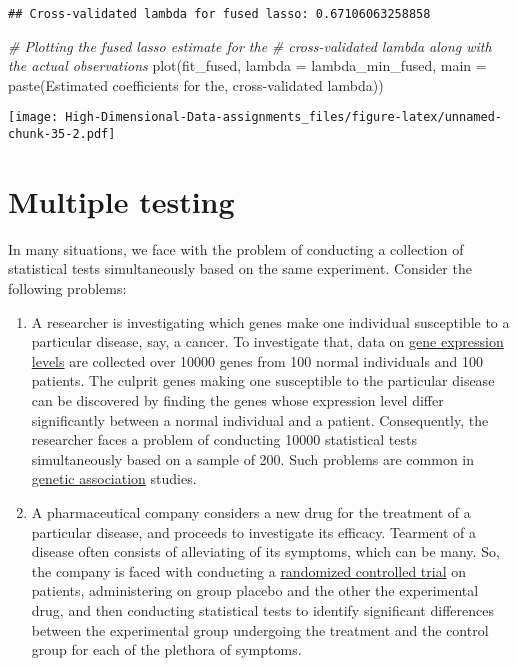 \documentclass[
]{book}
\newenvironment{Shaded}{\begin{snugshade}}{\end{snugshade}}
\newcommand{\AttributeTok}[1]{\textcolor[rgb]{0.77,0.63,0.00}{#1}}
\newcommand{\CommentTok}[1]{\textcolor[rgb]{0.56,0.35,0.01}{\textit{#1}}}
\newcommand{\FunctionTok}[1]{\textcolor[rgb]{0.00,0.00,0.00}{#1}}
\newcommand{\NormalTok}[1]{#1}
\newcommand{\StringTok}[1]{\textcolor[rgb]{0.31,0.60,0.02}{#1}}
\begin{document}
\begin{verbatim}
## Cross-validated lambda for fused lasso: 0.67106063258858
\end{verbatim}

\begin{Shaded}
\begin{Highlighting}[]
\CommentTok{\# Plotting the fused lasso estimate for the}
\CommentTok{\# cross{-}validated lambda along with the actual observations}
\FunctionTok{plot}\NormalTok{(fit\_fused, }\AttributeTok{lambda =}\NormalTok{ lambda\_min\_fused,}
     \AttributeTok{main =} \FunctionTok{paste}\NormalTok{(}\StringTok{\textquotesingle{}Estimated coefficients for the\textquotesingle{}}\NormalTok{,}
                  \StringTok{\textquotesingle{}cross{-}validated lambda\textquotesingle{}}\NormalTok{))}
\end{Highlighting}
\end{Shaded}

\texttt{[image: High-Dimensional-Data-assignments\_files/figure-latex/unnamed-chunk-35-2.pdf]}

\hypertarget{multipletesting}{%
\chapter{Multiple testing}\label{multipletesting}}

In many situations, we face with the problem of conducting a collection of statistical tests simultaneously based on the same experiment. Consider the following problems:

\begin{enumerate}
\def\labelenumi{\arabic{enumi}.}
\item
  A researcher is investigating which genes make one individual susceptible to a particular disease, say, a cancer. To investigate that, data on \href{https://en.wikipedia.org/wiki/Gene_expression\#Measurement}{gene expression levels} are collected over 10000 genes from 100 normal individuals and 100 patients. The culprit genes making one susceptible to the particular disease can be discovered by finding the genes whose expression level differ significantly between a normal individual and a patient. Consequently, the researcher faces a problem of conducting 10000 statistical tests simultaneously based on a sample of 200. Such problems are common in \href{https://en.wikipedia.org/wiki/Genetic_association}{genetic association} studies.
\item
  A pharmaceutical company considers a new drug for the treatment of a particular disease, and proceeds to investigate its efficacy. Tearment of a disease often consists of alleviating of its symptoms, which can be many. So, the company is faced with conducting a \href{https://en.wikipedia.org/wiki/Randomized_controlled_trial}{randomized controlled trial} on patients, administering on group placebo and the other the experimental drug, and then conducting statistical tests to identify significant differences between the experimental group undergoing the treatment and the control group for each of the plethora of symptoms.
\end{enumerate}
\end{document}

